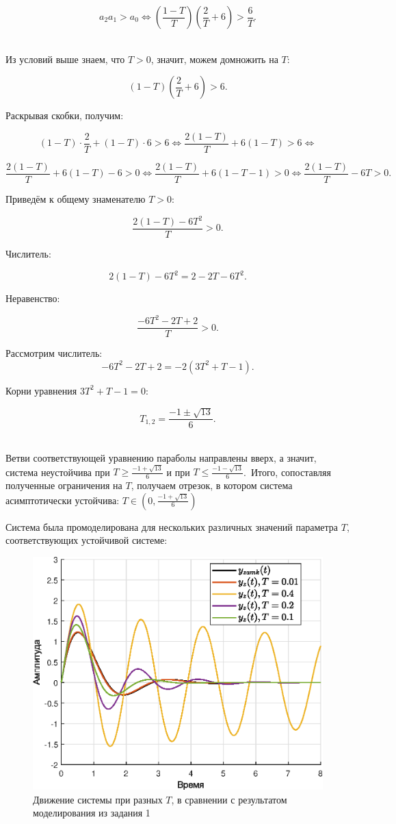 \documentclass[a4paper]{article}
\begin{document}
$$a_2 a_1 > a_0 \Leftrightarrow
\left(\frac{1 - T}{T}\right) \left(\frac{2}{T} + 6\right) > \frac{6}{T}.
$$\ 

Из условий выше знаем, что $T > 0$, значит, можем домножить на $T$:

\[
(1 - T)\left(\frac{2}{T} + 6\right) > 6.
\]

Раскрывая скобки, получим:

\[
(1 - T)\cdot\frac{2}{T} + (1 - T)\cdot6 > 6\Leftrightarrow
\frac{2(1 - T)}{T} + 6(1 - T) > 6\Leftrightarrow
\]

\[
\frac{2(1 - T)}{T} + 6(1 - T) - 6 > 0\Leftrightarrow
\frac{2(1 - T)}{T} + 6(1 - T - 1) > 0\Leftrightarrow
\frac{2(1 - T)}{T} - 6T > 0.
\]

Приведём к общему знаменателю \(T > 0\):

\[
\frac{2(1 - T) - 6T^2}{T} > 0.
\]

Числитель:

\[
2(1 - T) - 6T^2 = 2 - 2T - 6T^2.
\]

Неравенство:

\[
\frac{-6T^2 - 2T + 2}{T} > 0.
\]

Рассмотрим числитель:  
\[
-6T^2 - 2T + 2 = -2(3T^2 + T - 1).
\]

Корни уравнения \(3T^2 + T - 1 = 0\):

\[
T_{1, 2} = \frac{-1 \pm \sqrt{13}}{6}.
\]\ 

Ветви соответствующей уравнению параболы направлены вверх, а значит, система неустойчива при $T \ge \frac{-1 + \sqrt{13}}{6}$ и при $T\le \frac{-1 - \sqrt{13}}{6}$.\ Итого, сопоставляя полученные ограничения на $T$, получаем отрезок, в котором система асимптотически устойчива: $T \in \left(0, \frac{-1 + \sqrt{13}}{6}\right)$

Система была промоделирована для нескольких различных значений параметра $T$, соответствующих устойчивой системе:

\begin{figure}[H]
    \centering
    \includegraphics[width=0.65\linewidth]{ex2/all.eps}
    \caption{Движение системы при разных $T$, в сравнении с результатом моделирования из задания 1}
\end{figure}\
\end{document}
